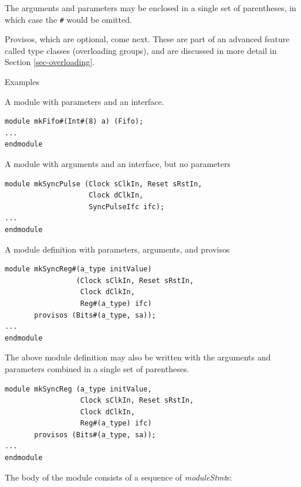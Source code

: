 \documentclass[twoside,letterpaper]{article}
\newcommand{\nterm}[1]{\emph{#1}}
\begin{document}
The arguments and parameters may be enclosed in a single set of
parentheses, in which case the {\verb'#'} would be omitted.

Provisos, which are optional, come next.  These are part of an
advanced feature called type classes (overloading groups), and are
discussed in more detail in Section \ref{sec-overloading}.

Examples

A module with parameters and an interface.
\begin{verbatim}
module mkFifo#(Int#(8) a) (Fifo);
...
endmodule
\end{verbatim}

A module with arguments and an interface, but no parameters
\begin{verbatim}
module mkSyncPulse (Clock sClkIn, Reset sRstIn, 
                    Clock dClkIn,
                    SyncPulseIfc ifc);
...
endmodule
\end{verbatim}

A module definition with parameters, arguments, and provisos
\begin{verbatim}
module mkSyncReg#(a_type initValue)
                 (Clock sClkIn, Reset sRstIn, 
                  Clock dClkIn, 
                  Reg#(a_type) ifc) 
       provisos (Bits#(a_type, sa));
...
endmodule
\end{verbatim}

The above module definition may also be written with the arguments and
parameters combined in a single set of parentheses.
\begin{verbatim}
module mkSyncReg (a_type initValue,
                  Clock sClkIn, Reset sRstIn, 
                  Clock dClkIn, 
                  Reg#(a_type) ifc) 
       provisos (Bits#(a_type, sa));
...
endmodule
\end{verbatim}

The body of the module consists of a sequence of
{\nterm{moduleStmt}}s:
\end{document}
